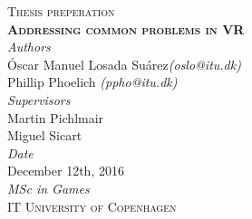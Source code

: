 \begin{titlepage}
\begin{center}

\textsc{\large Thesis preperation}\\[2cm]

\textsc{\huge \textbf{Addressing common problems in VR}}\\[8.2cm]

\textit{Authors}\\
Óscar Manuel Losada Suárez\textit{(oslo@itu.dk)}\\
Phillip Phoelich \textit{(ppho@itu.dk)}\\[1cm]

\textit{Supervisors}\\
Martin Pichlmair\\
Miguel Sicart\\[1cm]

\textit{Date}\\
December 12th, 2016\\

\vfill
\textit{MSc in Games}\\
\textsc{IT University of Copenhagen}

\end{center}
\end{titlepage}

\restoregeometry